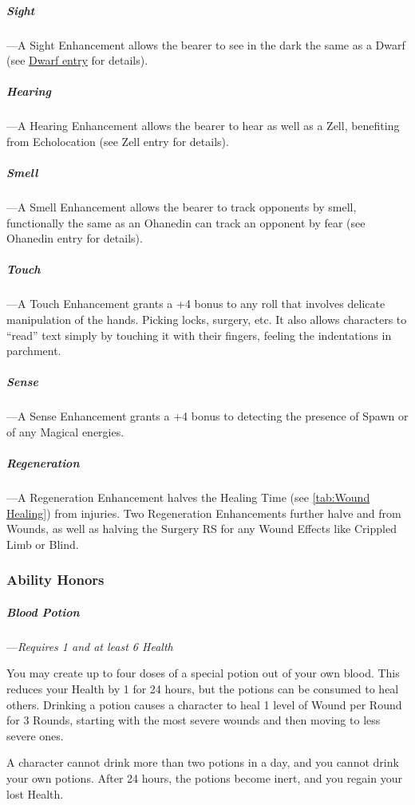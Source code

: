 \documentclass[oneside,11pt,english]{book}
\begin{document}
\subparagraph{Sight}\label{honor:Sight}
---\quad A Sight Enhancement allows the bearer to see in the dark the same as a Dwarf (see \hyperref[par:Dwarf - See in Shadow]{Dwarf entry} for details).

\subparagraph{Hearing}\label{honor:Hearing}
---\quad A Hearing Enhancement allows the bearer to hear as well as a Zell, benefiting from 
Echolocation (see Zell entry for details). 

\subparagraph{Smell}\label{honor:Smell}
---\quad A Smell Enhancement allows the bearer to track opponents by smell, functionally the 
same as an Ohanedin can track an opponent by fear (see Ohanedin entry for details). 

\subparagraph{Touch}\label{honor:Touch}
---\quad A Touch Enhancement grants a +4 bonus to any roll that involves delicate manipulation 
of the hands. Picking locks, surgery, etc. It also allows characters to “read” text simply by 
touching it with their fingers, feeling the indentations in parchment.

\subparagraph{Sense}\label{honor:Sense}
---\quad A Sense Enhancement grants a +4 bonus to detecting the presence of Spawn or of any 
Magical energies. 

\subparagraph{Regeneration}\label{honor:Regeneration}
---\quad A Regeneration Enhancement halves the Healing Time (see \autoref{tab:Wound Healing}) from injuries. Two 
Regeneration Enhancements further halve  and  from Wounds, as well as 
halving the Surgery RS for any Wound Effects like Crippled Limb or Blind.

\subsubsection{Ability Honors}
\subparagraph{Blood Potion}\label{honor:Blood Potion}
---\quad \emph{Requires  1 and at least 6 Health}

You may create up to four doses
of a special potion out of your own blood. This reduces your Health by 1 for 24 hours, but the 
potions can be consumed to heal others. Drinking a potion causes a character to heal 1 level of 
Wound per Round for 3 Rounds, starting with the most severe wounds and then moving to less 
severe ones. 

A character cannot drink more than two potions in a day, and you cannot drink your own 
potions. After 24 hours, the potions become inert, and you regain your lost Health. 
\end{document}
